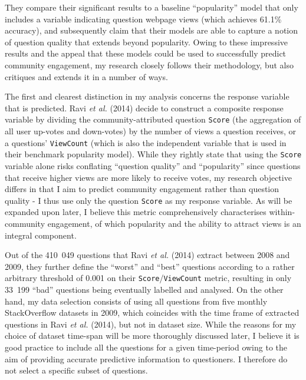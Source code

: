 \documentclass[11pt,preprint, authoryear]{article}
\begin{document}
They compare their significant results to a baseline ``popularity''
model that only includes a variable indicating question webpage views
(which achieves 61.1\% accuracy), and subsequently claim that their
models are able to capture a notion of question quality that extends
beyond popularity. Owing to these impressive results and the appeal that
these models could be used to successfully predict community engagement,
my research closely follows their methodology, but also critiques and
extends it in a number of ways.

The first and clearest distinction in my analysis concerns the response
variable that is predicted. Ravi \emph{et al.} (2014) decide to
construct a composite response variable by dividing the
community-attributed question \texttt{Score} (the aggregation of all
user up-votes and down-votes) by the number of views a question
receives, or a questions' \texttt{ViewCount} (which is also the
independent variable that is used in their benchmark popularity model).
While they rightly state that using the \texttt{Score} variable alone
risks conflating ``question quality'' and ``popularity'' since questions
that receive higher views are more likely to receive votes, my research
objective differs in that I aim to predict community engagement rather
than question quality - I thus use only the question \texttt{Score} as
my response variable. As will be expanded upon later, I believe this
metric comprehensively characterises within-community engagement, of
which popularity and the ability to attract views is an integral
component.

Out of the 410~049 questions that Ravi \emph{et al.} (2014) extract
between 2008 and 2009, they further define the ``worst'' and ``best''
questions according to a rather arbitrary threshold of 0.001 on their
\texttt{Score}/\texttt{ViewCount} metric, resulting in only 33~199
``bad'' questions being eventually labelled and analysed. On the other
hand, my data selection consists of using all questions from five
monthly StackOverflow datasets in 2009, which coincides with the time
frame of extracted questions in Ravi \emph{et al.} (2014), but not in
dataset size. While the reasons for my choice of dataset time-span will
be more thoroughly discussed later, I believe it is good practice to
include all the questions for a given time-period owing to the aim of
providing accurate predictive information to questioners. I therefore do
not select a specific subset of questions.
\end{document}
